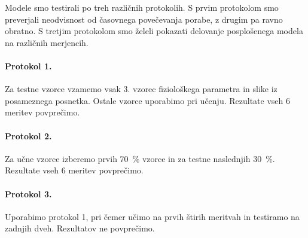 Modele smo testirali po treh različnih protokolih. S prvim protokolom smo preverjali neodvisnost od časovnega povečevanja porabe, z drugim pa ravno obratno. S tretjim protokolom smo želeli pokazati delovanje posplošenega modela na različnih merjencih.


\paragraph{Protokol 1.}
Za testne vzorce vzamemo vsak 3. vzorec fiziološkega parametra in slike iz posameznega posnetka. Ostale vzorce uporabimo pri učenju. Rezultate vseh 6 meritev povprečimo.

\paragraph{Protokol 2.}
Za učne vzorce izberemo prvih \SI{70}{\%} vzorce in za testne naslednjih \SI{30}{\%}. Rezultate vseh 6 meritev povprečimo.

\paragraph{Protokol 3.}
Uporabimo protokol 1, pri čemer učimo na prvih štirih meritvah in testiramo na zadnjih dveh. Rezultatov ne povprečimo.

